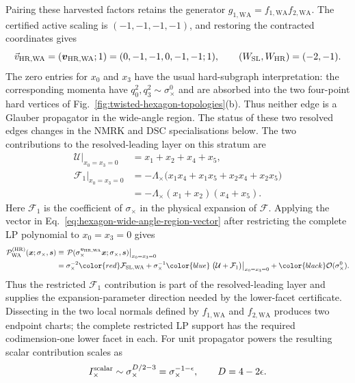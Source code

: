 \documentclass[a4paper,11pt]{article}
\newcommand{\x}{\boldsymbol{x}}
\newcommand{\s}{\boldsymbol{s}}
\newcommand{\HR}{\mathrm{HR}}
\newcommand{\WSL}{W_{\rm SL}}
\newcommand{\WHR}{W_{\rm HR}}
\newcommand{\SLcolour}[1]{{\color{red}#1}}
\newcommand{\HRcolour}[1]{{\color{blue}#1}}
\newcommand{\Othercolour}[1]{{\color{black}#1}}
\begin{document}
Pairing these harvested factors retains the generator
\(g_{1,\mathrm{WA}}=f_{1,\mathrm{WA}}f_{2,\mathrm{WA}}\).  The certified
active scaling
is \((-1,-1,-1,-1)\), and restoring the contracted coordinates gives
\begin{equation}
 \vec v_{\rm HR,WA}
 =(\boldsymbol v_{\rm HR,WA};1)
 =(0,-1,-1,0,-1,-1;1),
 \qquad
 (\WSL,\WHR)=(-2,-1).
 \label{eq:hexagon-wide-angle-region-vector}
\end{equation}
The zero entries for \(x_0\) and \(x_3\) have the usual hard-subgraph
interpretation: the corresponding momenta have
\(q_0^2,q_3^2\sim\sigma_\times^0\) and are absorbed into the two four-point
hard vertices of Fig.~\ref{fig:twisted-hexagon-topologies}(b).  Thus neither
edge is a Glauber propagator in the wide-angle region.  The status of these
two resolved edges changes in the NMRK and DSC specialisations below.
The two contributions to the resolved-leading layer on this stratum are
\begin{align}
 \left.\mathcal U\right|_{x_0=x_3=0}
 &=x_1+x_2+x_4+x_5,\nonumber\\
 \left.\mathcal F_1\right|_{x_0=x_3=0}
 &=-\Lambda_\times
   \bigl(x_1x_4+x_1x_5+x_2x_4+x_2x_5\bigr)\nonumber\\
 &=-\Lambda_\times(x_1+x_2)(x_4+x_5).
 \label{eq:hexagon-wide-angle-resolved-pieces}
\end{align}
Here \(\mathcal F_1\) is the coefficient of \(\sigma_\times\) in the
physical expansion of \(\mathcal F\).
Applying the vector in Eq.~\eqref{eq:hexagon-wide-angle-region-vector} after
restricting the complete LP polynomial to \(x_0=x_3=0\) gives
\begin{equation}
\begin{aligned}
 \mathcal P_{\mathrm{WA}}^{(\HR)}(\x;\sigma_\times,\s)
 &\equiv
 \left.\mathcal P(\sigma_\times^{\boldsymbol v_{\rm HR,WA}}\x;
            \sigma_\times,\s)\right|_{x_0=x_3=0}\\
 &=\sigma_\times^{-2}\SLcolour{\mathcal F_{\mathrm{SL,WA}}}
  +\sigma_\times^{-1}\HRcolour{\left.
       \bigl(\mathcal U+\mathcal F_1\bigr)\right|_{x_0=x_3=0}}
  +\Othercolour{\mathcal O(\sigma_\times^0)}.
\end{aligned}
\label{eq:hexagon-wide-angle-complete-layers}
\end{equation}
Thus the restricted \(\mathcal F_1\) contribution is part of the
resolved-leading layer and supplies the expansion-parameter direction needed
by the lower-facet certificate.  Dissecting in the two local normals defined
by \(f_{1,\mathrm{WA}}\) and \(f_{2,\mathrm{WA}}\) produces two endpoint
charts; the complete restricted LP support
has the required codimension-one lower facet in each.  For unit propagator powers the
resulting scalar contribution scales as
\begin{equation}
 I_\times^{\rm scalar}\sim
 \sigma_\times^{D/2-3}=\sigma_\times^{-1-\epsilon},
 \qquad D=4-2\epsilon.
 \label{eq:hexagon-self-crossing-scalar-power}
\end{equation}
\end{document}
